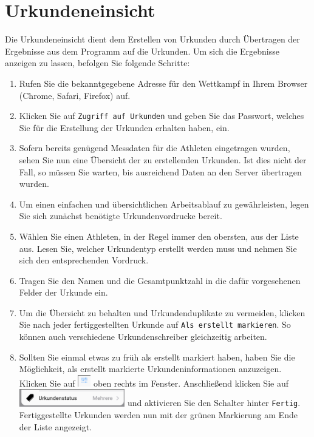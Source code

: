 \documentclass[11pt,a4paper,titlepage,german]{article}
\begin{document}
		\section{Urkundeneinsicht}
			Die Urkundeneinsicht dient dem Erstellen von Urkunden durch Übertragen der Ergebnisse aus dem Programm auf die Urkunden. Um sich die Ergebnisse anzeigen zu lassen, befolgen Sie folgende Schritte:
			\begin{enumerate}
				\item Rufen Sie die bekanntgegebene Adresse für den Wettkampf in Ihrem Browser (Chrome, Safari, Firefox) auf.
				
				\item Klicken Sie auf \texttt{Zugriff auf Urkunden} und geben Sie das Passwort, welches Sie für die Erstellung der Urkunden erhalten haben, ein.
				
				\item Sofern bereits genügend Messdaten für die Athleten eingetragen wurden, sehen Sie nun eine Übersicht der zu erstellenden Urkunden. Ist dies nicht der Fall, so müssen Sie warten, bis ausreichend Daten an den Server übertragen wurden.
				
				\item Um einen einfachen und übersichtlichen Arbeitsablauf zu gewährleisten, legen Sie sich zunächst benötigte Urkundenvordrucke bereit.
				
				\item Wählen Sie einen Athleten, in der Regel immer den obersten, aus der Liste aus. Lesen Sie, welcher Urkundentyp erstellt werden muss und nehmen Sie sich den entsprechenden Vordruck.
				
				\item Tragen Sie den Namen und die Gesamtpunktzahl in die dafür vorgesehenen Felder der Urkunde ein.
				
				\item Um die Übersicht zu behalten und Urkundenduplikate zu vermeiden, klicken Sie nach jeder fertiggestellten Urkunde auf \texttt{Als erstellt markieren}. So können auch verschiedene Urkundenschreiber gleichzeitig arbeiten.
				
				\item Sollten Sie einmal etwas zu früh als erstellt markiert haben, haben Sie die Möglichkeit, als erstellt markierte Urkundeninformationen anzuzeigen. Klicken Sie auf \includegraphics[height=0.5cm]{Settings} oben rechts im Fenster. Anschließend klicken Sie auf \includegraphics[height=0.75cm]{CertificateSettings} und aktivieren Sie den Schalter hinter \texttt{Fertig}. Fertiggestellte Urkunden werden nun mit der grünen Markierung am Ende der Liste angezeigt.
				
			\end{enumerate}
		
\end{document}
